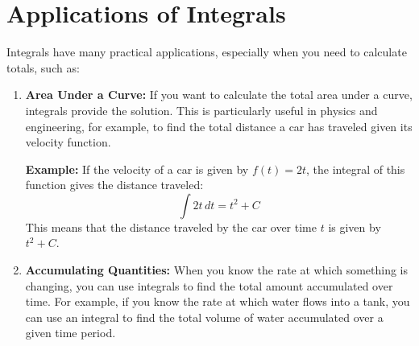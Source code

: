 \section{Applications of Integrals}
Integrals have many practical applications, especially when you need to calculate totals, such as:
\begin{enumerate}
    \item \textbf{Area Under a Curve:} If you want to calculate the total area under a curve, integrals provide the solution. This is particularly useful in physics and engineering, for example, to find the total distance a car has traveled given its velocity function.

    \textbf{Example:} If the velocity of a car is given by \( f(t) = 2t \), the integral of this function gives the distance traveled:
    \[
    \int 2t \, dt = t^2 + C
    \]
    This means that the distance traveled by the car over time \( t \) is given by \( t^2 + C \).

    \begin{center}
    \end{center}

    \item \textbf{Accumulating Quantities:} When you know the rate at which something is changing, you can use integrals to find the total amount accumulated over time. For example, if you know the rate at which water flows into a tank, you can use an integral to find the total volume of water accumulated over a given time period.


\end{enumerate}
